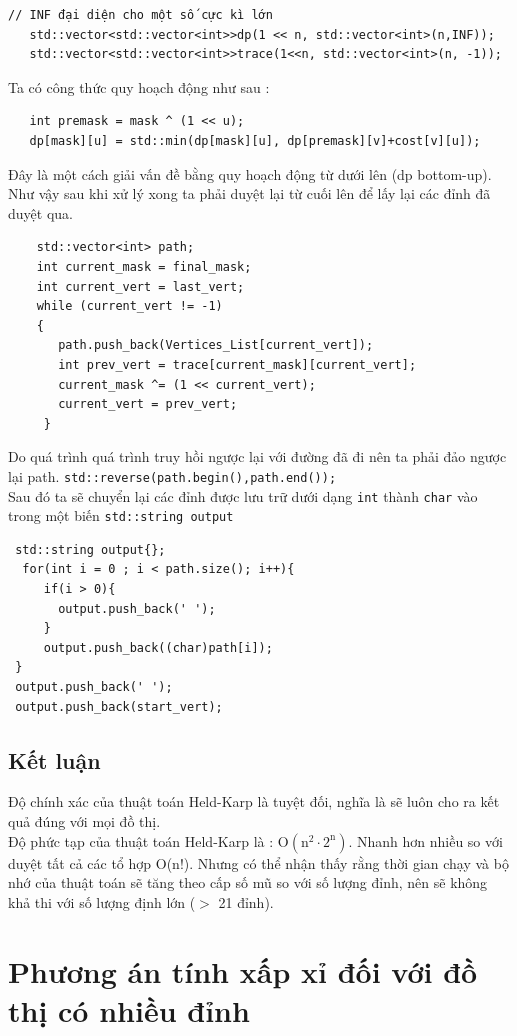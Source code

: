 \documentclass[11pt,a4paper,openany]{report}
\begin{document}
\begin{verbatim}
// INF đại diện cho một số cực kì lớn
   std::vector<std::vector<int>>dp(1 << n, std::vector<int>(n,INF));
   std::vector<std::vector<int>>trace(1<<n, std::vector<int>(n, -1));
\end{verbatim}
Ta có công thức quy hoạch động như sau :
\begin{verbatim}
   int premask = mask ^ (1 << u);
   dp[mask][u] = std::min(dp[mask][u], dp[premask][v]+cost[v][u]);
\end{verbatim}
Đây là một cách giải vấn đề bằng quy hoạch động từ dưới lên (dp bottom-up). 
Như vậy sau khi xử lý xong ta phải duyệt lại từ cuối lên để lấy lại các đỉnh đã duyệt qua.
\begin{verbatim}
    std::vector<int> path;
    int current_mask = final_mask;
    int current_vert = last_vert;
    while (current_vert != -1)
    {
       path.push_back(Vertices_List[current_vert]);
       int prev_vert = trace[current_mask][current_vert];
       current_mask ^= (1 << current_vert);
       current_vert = prev_vert;
     }
\end{verbatim}
Do quá trình quá trình truy hồi ngược lại với đường đã đi nên ta phải đảo ngược lại path.
\texttt{std::reverse(path.begin(),path.end());}\\
Sau đó ta sẽ chuyển lại các đỉnh được lưu trữ dưới dạng \texttt{int} thành \texttt{char} vào trong một biến
\texttt{std::string output}
\begin{verbatim}
 std::string output{};
  for(int i = 0 ; i < path.size(); i++){
     if(i > 0){
       output.push_back(' ');
     }  
     output.push_back((char)path[i]);
 }
 output.push_back(' ');
 output.push_back(start_vert);
\end{verbatim}
\subsection{Kết luận}
Độ chính xác của thuật toán Held-Karp là tuyệt đối, nghĩa là sẽ luôn cho ra kết quả đúng với mọi đồ thị.
\\
Độ phức tạp của thuật toán Held-Karp là : $\mathrm{O (n^2 \cdot 2^n)}$. Nhanh hơn nhiều so với duyệt tất cả các tổ hợp O(n!).
Nhưng có thể nhận thấy rằng thời gian chạy và bộ nhớ của thuật toán sẽ tăng theo cấp số mũ so với số lượng đỉnh, nên sẽ không khả thi với số lượng định lớn ($>$ 21 đỉnh).
\newpage
\section{Phương án tính xấp xỉ đối với đồ thị có nhiều đỉnh}
\end{document}
